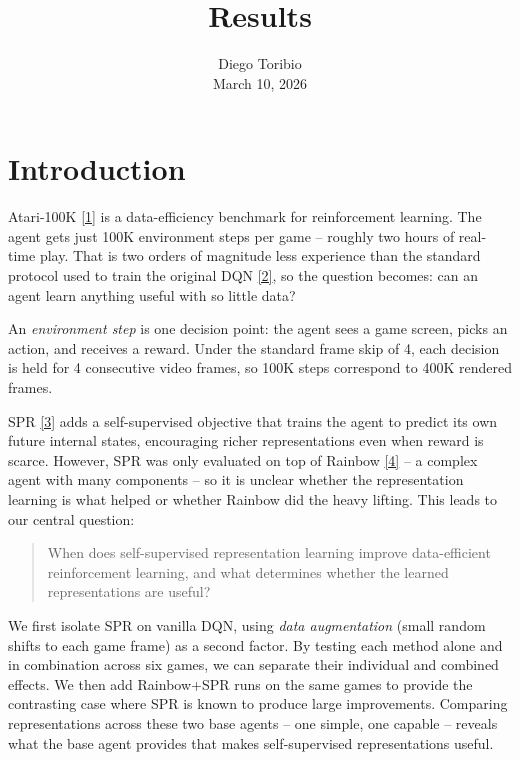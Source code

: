 \documentclass[11pt]{article}
\title{Results}
\author{Diego Toribio\\[0.3em]{\normalsize March 10, 2026}}
\date{\vspace{-2.5em}}
\newcommand{\citelink}[2]{\href{#1}{\small[#2]}}
\begin{document}
\maketitle
\thispagestyle{empty}

\section{Introduction}

Atari-100K \citelink{https://arxiv.org/abs/1903.00374}{1} is a
data-efficiency benchmark for reinforcement learning. The agent gets
just 100K environment steps per game -- roughly two hours of real-time
play. That is two orders of magnitude less experience than the standard
protocol used to train the original DQN
\citelink{https://www.nature.com/articles/nature14236}{2}, so the
question becomes: can an agent learn anything useful with so little
data?

\medskip
An \textit{environment step} is one decision point: the agent sees a
game screen, picks an action, and receives a reward. Under the standard
frame skip of 4, each decision is held for 4 consecutive video frames,
so 100K steps correspond to 400K rendered frames.

\medskip
SPR \citelink{https://arxiv.org/abs/2007.05929}{3} adds a
self-supervised objective that trains the agent to predict its own
future internal states, encouraging richer representations even when
reward is scarce. However, SPR was only evaluated on top of Rainbow
\citelink{https://arxiv.org/abs/1710.02298}{4} -- a complex agent with
many components -- so it is unclear whether the representation learning
is what helped or whether Rainbow did the heavy lifting. This leads to
our central question:

\begin{quote}
When does self-supervised representation learning improve data-efficient
reinforcement learning, and what determines whether the learned
representations are useful?
\end{quote}

\medskip
We first isolate SPR on vanilla DQN, using \textit{data augmentation}
(small random shifts to each game frame) as a second factor. By testing
each method alone and in combination across six games, we can separate
their individual and combined effects. We then add Rainbow+SPR runs on
the same games to provide the contrasting case where SPR is known to
produce large improvements. Comparing representations across these two
base agents -- one simple, one capable -- reveals what the base agent
provides that makes self-supervised representations useful.
\end{document}
